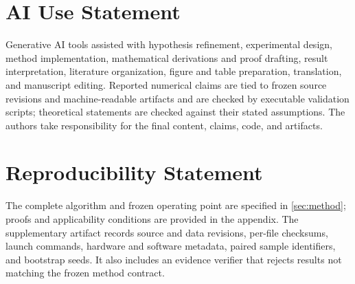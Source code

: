 \documentclass{article}
\newcommand{\1}{\mathbf{1}}
\begin{document}







\clearpage
\section*{AI Use Statement}
Generative AI tools assisted with hypothesis refinement, experimental design,
method implementation, mathematical derivations and proof drafting, result
interpretation, literature organization, figure and table preparation,
translation, and manuscript editing.  Reported numerical claims are tied to
frozen source revisions and machine-readable artifacts and are checked by
executable validation scripts; theoretical statements are checked against
their stated assumptions.  The authors take responsibility for the final
content, claims, code, and artifacts.

\section*{Reproducibility Statement}
The complete algorithm and frozen operating point are specified in
\cref{sec:method}; proofs and applicability conditions are provided in the
appendix.  The supplementary artifact records source and data revisions,
per-file checksums, launch commands, hardware and software metadata, paired
sample identifiers, and bootstrap seeds.  It also includes an evidence
verifier that rejects results not matching the frozen method contract.




\clearpage
\appendix

\end{document}
